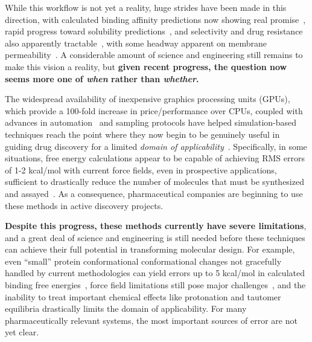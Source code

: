 \documentclass[11pt]{article}
\begin{document}
While this workflow is not yet a reality, huge strides have been made in this direction, with calculated binding affinity predictions now showing real promise~\cite{mobley_perspective_2012, christ_accuracy_2014, deng_distinguishing_2015, sherborne_preprint_2016, schrodinger_accurate_2015, christ_binding_2016, cui_affinity_2016, verras_free_2016}, rapid progress toward solubility predictions~\cite{Schnieders:2012:J.Chem.TheoryComput., park_absolute_2014, liu_using_2016}, and selectivity and drug resistance also apparently tractable~\cite{leonis_contribution_2013}, with some headway apparent on membrane permeability~\cite{lee_permeability_2016, comer_permeability_2014}. 
A considerable amount of science and engineering still remains to make this vision a reality, but \textbf{given recent progress, the question now seems more one of \emph{when} rather than \emph{whether}.} 

The widespread availability of inexpensive graphics processing units (GPUs), which provide a 100-fold increase in price/performance over CPUs, coupled with advances in automation~\cite{liu_lead_2013} and sampling protocols have helped simulation-based techniques reach the point where they now begin to be genuinely useful in guiding drug discovery for a limited \emph{domain of applicability}~\cite{mikulskis_large-scale_2014, homeyer_binding_2014, sherborne_preprint_2016,  schrodinger_accurate_2015, christ_binding_2016, cui_affinity_2016, verras_free_2016}.
Specifically, in some situations, free energy calculations appear to be capable of achieving RMS errors of 1-2 kcal/mol with current force fields, even in prospective applications, sufficient to drastically reduce the number of molecules that must be synthesized and assayed~\cite{shirts_free-energy_2010}.
As a consequence, pharmaceutical companies are beginning to use these methods in active discovery projects.

\textbf{Despite this progress, these methods currently have severe limitations}, and a great deal of science and engineering is still needed before these techniques can achieve their full potential in transforming molecular design.
For example, even ``small'' protein conformational conformational changes not gracefully handled by current methodologies can yield errors up to 5 kcal/mol in calculated binding free energies~\cite{lim_sensitivity_2016}, force field limitations still pose major challenges~\cite{rocklin_blind_2013}, and the inability to treat important chemical effects like protonation and tautomer equilibria drastically limits the domain of applicability.
For many pharmaceutically relevant systems, the most important sources of error are not yet clear.
\end{document}
